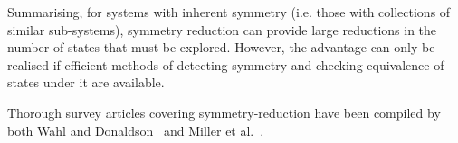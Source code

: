 Summarising, for systems with inherent symmetry (i.e. those with collections
of similar sub-systems), symmetry reduction can provide large reductions in the
number of states that must be explored. However, the advantage can only be
realised if efficient methods of detecting symmetry and checking equivalence of
states under it are available.

Thorough survey articles covering symmetry-reduction have been compiled by both
{Wahl and Donaldson}~\cite{Wahl2010} and {Miller et al.}~\cite{Miller2006}.
